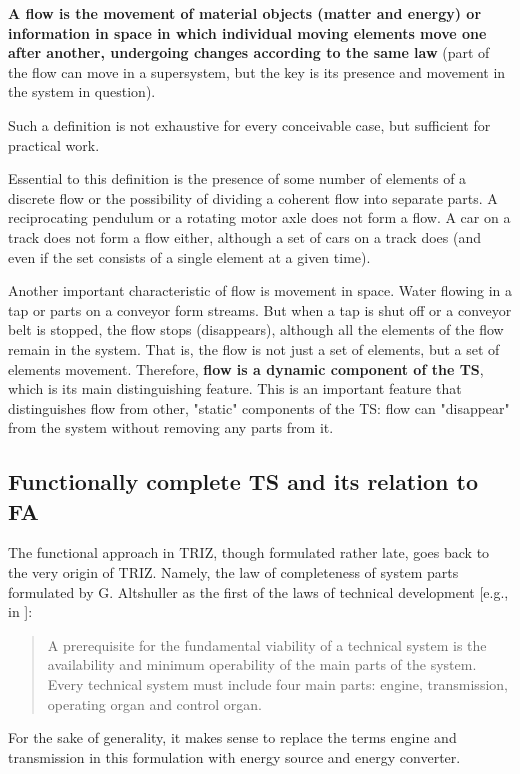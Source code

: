 \documentclass[a4paper,11pt]{article}
\begin{document}
\textbf{A flow is the movement of material objects (matter and energy) or
  information in space in which individual moving elements move one after
  another, undergoing changes according to the same law} (part of the flow can
move in a supersystem, but the key is its presence and movement in the system
in question).

Such a definition is not exhaustive for every conceivable case, but sufficient
for practical work.

Essential to this definition is the presence of some number of elements of a
discrete flow or the possibility of dividing a coherent flow into separate
parts. A reciprocating pendulum or a rotating motor axle does not form a
flow. A car on a track does not form a flow either, although a set of cars on
a track does (and even if the set consists of a single element at a given
time).

Another important characteristic of flow is movement in space. Water flowing
in a tap or parts on a conveyor form streams. But when a tap is shut off or a
conveyor belt is stopped, the flow stops (disappears), although all the
elements of the flow remain in the system. That is, the flow is not just a set
of elements, but a set of elements movement. Therefore, \textbf{flow is a
  dynamic component of the TS}, which is its main distinguishing feature. This
is an important feature that distinguishes flow from other, "static"
components of the TS: flow can "disappear" from the system without removing
any parts from it.

\subsection{Functionally complete TS and its relation to FA}

The functional approach in TRIZ, though formulated rather late, goes back to
the very origin of TRIZ. Namely, the law of completeness of system parts
formulated by G. Altshuller as the first of the laws of technical development
[e.g., in \cite{B1}]:
\begin{quote}
  A prerequisite for the fundamental viability of a technical system is the
  availability and minimum operability of the main parts of the system. Every
  technical system must include four main parts: engine, transmission,
  operating organ and control organ.
\end{quote}

For the sake of generality, it makes sense to replace the terms engine and
transmission in this formulation with energy source and energy converter.
\end{document}
